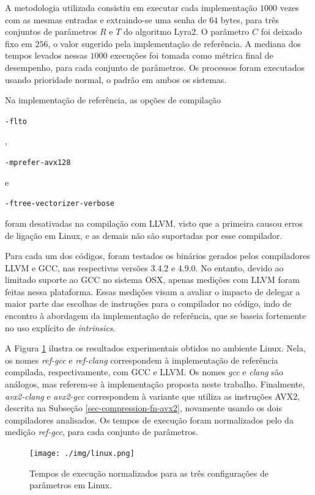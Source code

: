 \documentclass{article}
\begin{document}
A metodologia utilizada consistiu em executar cada implementação
$1000$ vezes com as mesmas entradas e extraindo-se uma senha de $64$
bytes, para três conjuntos de parâmetros $R$ e $T$ do algoritmo
Lyra2. O parâmetro $C$ foi deixado fixo em $256$, o valor sugerido
pela implementação de referência. A mediana dos tempos levados nessas
$1000$ execuções foi tomada como métrica final de desempenho, para
cada conjunto de parâmetros. Os processos foram executados usando
prioridade normal, o padrão em ambos os sistemas.

Na implementação de referência, as opções de compilação
\begin{small}\verb|-flto|\end{small},
\begin{small}\verb|-mprefer-avx128|\end{small} e
\begin{small}\verb|-ftree-vectorizer-verbose|\end{small} foram desativadas na
compilação com LLVM, visto que a primeira causou erros de ligação em Linux, e
as demais não são suportadas por esse compilador.

Para cada um dos códigos, foram testados os binários gerados pelos
compiladores LLVM e GCC, nas respectivas versões 3.4.2 e 4.9.0. No
entanto, devido ao limitado suporte ao GCC no sistema OSX, apenas
medições com LLVM foram feitas nessa plataforma. Essas medições visam a
avaliar o impacto de delegar a maior parte das escolhas de instruções
para o compilador no código, indo de encontro à abordagem da
implementação de referência, que se baseia fortemente no uso explícito
de \emph{intrinsics}.

A Figura \ref{results-linux} ilustra os resultados experimentais obtidos
no ambiente Linux. Nela, os nomes \emph{ref-gcc} e \emph{ref-clang}
correspondem à implementação de referência compilada, respectivamente,
com GCC e LLVM. Os nomes \emph{gcc} e \emph{clang} são análogos, mas
referem-se à implementação proposta neste trabalho. Finalmente,
\emph{avx2-clang} e \emph{avx2-gcc} correspondem à variante que utiliza
as instruções AVX2, descrita na Subseção \ref{sec-compression-fn-avx2},
novamente usando os dois compiladores analisados. Os tempos de execução
foram normalizados pelo da medição \emph{ref-gcc}, para cada conjunto de
parâmetros.

\begin{figure}[htbp]
\centering
\texttt{[image: ./img/linux.png]}
\caption{Tempos de execução normalizados para as três configurações de parâmetros em Linux\label{results-linux}.}
\end{figure}
\end{document}
